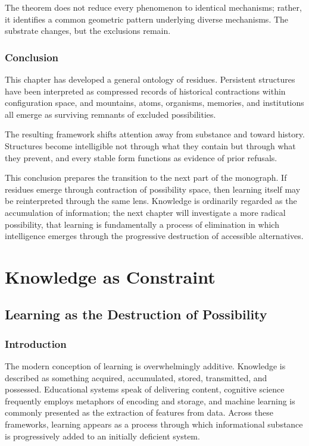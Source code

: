 \documentclass[11pt,oneside]{book}
\theoremstyle{plain}
\theoremstyle{definition}
\theoremstyle{remark}
\begin{document}
The theorem does not reduce every phenomenon to identical mechanisms; rather, it identifies a common geometric pattern underlying diverse mechanisms. The substrate changes, but the exclusions remain.

\section{Conclusion}

This chapter has developed a general ontology of residues. Persistent structures have been interpreted as compressed records of historical contractions within configuration space, and mountains, atoms, organisms, memories, and institutions all emerge as surviving remnants of excluded possibilities.

The resulting framework shifts attention away from substance and toward history. Structures become intelligible not through what they contain but through what they prevent, and every stable form functions as evidence of prior refusals.

This conclusion prepares the transition to the next part of the monograph. If residues emerge through contraction of possibility space, then learning itself may be reinterpreted through the same lens. Knowledge is ordinarily regarded as the accumulation of information; the next chapter will investigate a more radical possibility, that learning is fundamentally a process of elimination in which intelligence emerges through the progressive destruction of accessible alternatives.

\part{Knowledge as Constraint}

\chapter{Learning as the Destruction of Possibility}

\section{Introduction}

The modern conception of learning is overwhelmingly additive. Knowledge is described as something acquired, accumulated, stored, transmitted, and possessed. Educational systems speak of delivering content, cognitive science frequently employs metaphors of encoding and storage, and machine learning is commonly presented as the extraction of features from data. Across these frameworks, learning appears as a process through which informational substance is progressively added to an initially deficient system.
\end{document}
